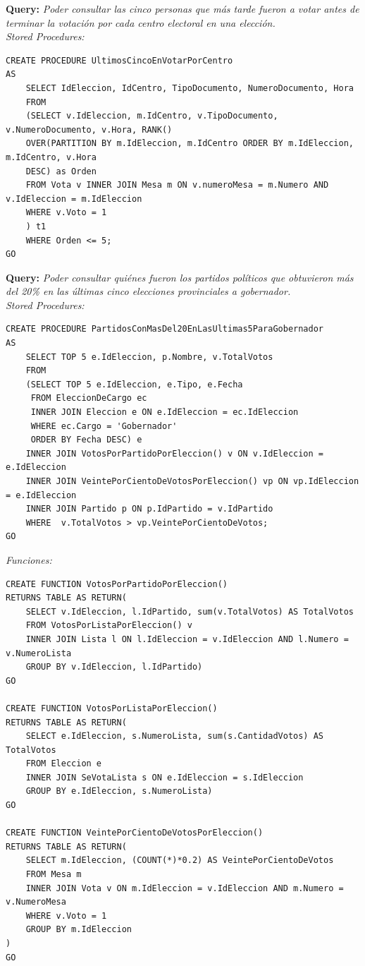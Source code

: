 \documentclass[10pt,a4paper]{article}
\begin{document}
\textbf{Query:} \textit{Poder consultar las cinco personas que más tarde fueron a votar antes de terminar la votación por cada centro electoral en una elección.}\\

\textit{Stored Procedures:}
\begin{verbatim}
CREATE PROCEDURE UltimosCincoEnVotarPorCentro
AS 
	SELECT IdEleccion, IdCentro, TipoDocumento, NumeroDocumento, Hora
	FROM 
	(SELECT v.IdEleccion, m.IdCentro, v.TipoDocumento, v.NumeroDocumento, v.Hora, RANK() 
	OVER(PARTITION BY m.IdEleccion, m.IdCentro ORDER BY m.IdEleccion, m.IdCentro, v.Hora 
	DESC) as Orden
	FROM Vota v INNER JOIN Mesa m ON v.numeroMesa = m.Numero AND v.IdEleccion = m.IdEleccion
	WHERE v.Voto = 1
	) t1
	WHERE Orden <= 5;
GO
\end{verbatim}

\textbf{Query:} \textit{Poder consultar quiénes fueron los partidos políticos que obtuvieron más del 20\% en las últimas cinco elecciones provinciales a gobernador.}\\

\textit{Stored Procedures:}
\begin{verbatim}
CREATE PROCEDURE PartidosConMasDel20EnLasUltimas5ParaGobernador
AS 
	SELECT TOP 5 e.IdEleccion, p.Nombre, v.TotalVotos
	FROM 
	(SELECT TOP 5 e.IdEleccion, e.Tipo, e.Fecha
	 FROM EleccionDeCargo ec
	 INNER JOIN Eleccion e ON e.IdEleccion = ec.IdEleccion
	 WHERE ec.Cargo = 'Gobernador'
	 ORDER BY Fecha DESC) e
	INNER JOIN VotosPorPartidoPorEleccion() v ON v.IdEleccion = e.IdEleccion
	INNER JOIN VeintePorCientoDeVotosPorEleccion() vp ON vp.IdEleccion = e.IdEleccion
	INNER JOIN Partido p ON p.IdPartido = v.IdPartido
	WHERE  v.TotalVotos > vp.VeintePorCientoDeVotos;
GO
\end{verbatim}

\textit{Funciones:}

\begin{verbatim}
CREATE FUNCTION VotosPorPartidoPorEleccion()
RETURNS TABLE AS RETURN(
	SELECT v.IdEleccion, l.IdPartido, sum(v.TotalVotos) AS TotalVotos
	FROM VotosPorListaPorEleccion() v
	INNER JOIN Lista l ON l.IdEleccion = v.IdEleccion AND l.Numero = v.NumeroLista
	GROUP BY v.IdEleccion, l.IdPartido)
GO

CREATE FUNCTION VotosPorListaPorEleccion()
RETURNS TABLE AS RETURN(
	SELECT e.IdEleccion, s.NumeroLista, sum(s.CantidadVotos) AS TotalVotos
	FROM Eleccion e 
	INNER JOIN SeVotaLista s ON e.IdEleccion = s.IdEleccion	
	GROUP BY e.IdEleccion, s.NumeroLista)
GO

CREATE FUNCTION VeintePorCientoDeVotosPorEleccion()
RETURNS TABLE AS RETURN(
	SELECT m.IdEleccion, (COUNT(*)*0.2) AS VeintePorCientoDeVotos
	FROM Mesa m 
	INNER JOIN Vota v ON m.IdEleccion = v.IdEleccion AND m.Numero = v.NumeroMesa
	WHERE v.Voto = 1
	GROUP BY m.IdEleccion
)
GO
\end{verbatim}
\newpage
\end{document}
